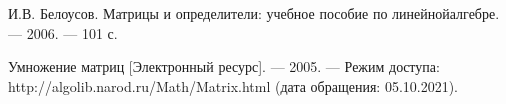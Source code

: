 \begin{thebibliography}{9}
    \label{cha:biblio}
    
     И.В. Белоусов. Матрицы и определители: учебное пособие по линейнойалгебре. — 2006. — 101 с.
    
     Умножение матриц [Электронный ресурс]. — 2005. — Режим до­ступа: http://algolib.narod.ru/Math/Matrix.html (дата обращения: 05.10.2021).

\end{thebibliography}
